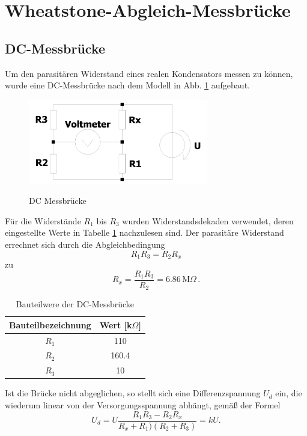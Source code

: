 \section{Wheatstone-Abgleich-Messbrücke}
\subsection{DC-Messbrücke}
Um den parasitären Widerstand eines realen Kondensators messen zu können, wurde eine DC-Messbrücke nach dem Modell in Abb. \ref{fig:dc_messbruecke} aufgebaut. 
\begin{figure}[H]
	\includegraphics[width=0.7\textwidth]{./img/ch3/DC_Wheatstone_Messbruecke.png}
	\centering
	\label{fig:dc_messbruecke}
	\caption{DC Messbrücke}
\end{figure}
Für die Widerstände $R_1$ bis $R_3$ wurden Widerstandsdekaden verwendet, deren eingestellte Werte in Tabelle \ref{tb:dc_bt} nachzulesen sind. Der parasitäre Widerstand errechnet sich durch die Abgleichbedingung 
\begin{equation}
	R_1 R_3 = R_2 R_x
\end{equation}
zu 
\begin{equation}
	R_x=\frac{R_1 R_3}{R_2} = 6.86\,\text{M}\Omega\,.
\end{equation}
\begin{table}[h]
	\begin{tabular}{|c|c|}
	\hline 
	Bauteilbezeichnung & Wert [k$\Omega$] \\ 
	\hline 
	$R_1$ & 110 \\ 
	\hline 
	$R_2$ & 160.4 \\ 
	\hline 
	$R_3$ & 10 \\ 
	\hline 
	\end{tabular}
	\centering
	\label{tb:dc_bt}
	\caption{Bauteilwere der DC-Messbrücke}
\end{table}
Ist die Brücke nicht abgeglichen, so stellt sich eine Differenzspannung $U_d$ ein, die wiederum linear von der Versorgungsspannung abhängt, gemäß der Formel 
\begin{equation}
	U_d = U \frac{R_1 R_3-R_2 R_x}{R_x+R_1)(R_2+R_3)} = k U.
\end{equation}
